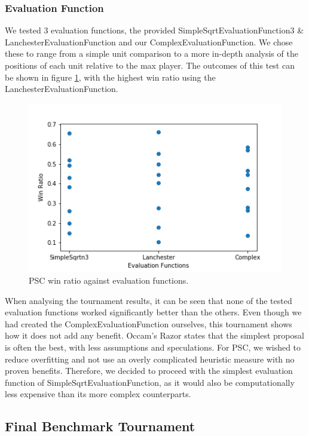\documentclass[]{article}
\begin{document}
\subsubsection{Evaluation Function}

We tested 3 evaluation functions, the provided SimpleSqrtEvaluationFunction3 \&  LanchesterEvaluationFunction and our ComplexEvaluationFunction. We chose these to range from a simple unit comparison to a more in-depth analysis of the positions of each unit relative to the max player. The outcomes of this test can be shown in figure \ref{fig:WinRatioAgainstEvalFunc}, with the highest win ratio using the LanchesterEvaluationFunction.

\begin{figure}
	\includegraphics[width=\linewidth]{WinRatioAgainstEvalFunc.png}
	\caption{PSC win ratio against evaluation functions.}
	\label{fig:WinRatioAgainstEvalFunc}
\end{figure}

When analysing the tournament results, it can be seen that none of the tested evaluation functions worked significantly better than the others. Even though we had created the ComplexEvaluationFunction ourselves, this tournament shows how it does not add any benefit. Occam’s Razor states that the simplest proposal is often the best, with less assumptions and speculations. For PSC, we wished to reduce overfitting and not use an overly complicated heuristic measure with no proven benefits. Therefore, we decided to proceed with the simplest evaluation function of SimpleSqrtEvaluationFunction, as it would also be computationally less expensive than its more complex counterparts. 

\subsection{Final Benchmark Tournament}
\end{document}
